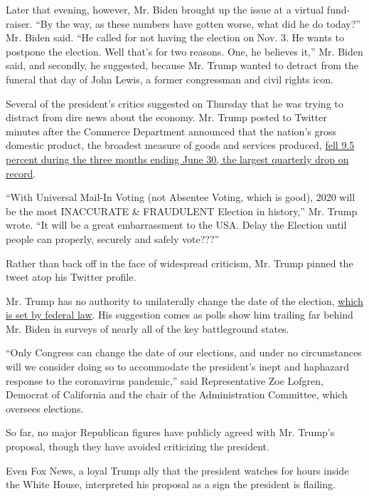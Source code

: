 Later that evening, however, Mr. Biden brought up the issue at a virtual
fund-raiser. ``By the way, as these numbers have gotten worse, what did
he do today?'' Mr. Biden said. ``He called for not having the election
on Nov. 3. He wants to postpone the election. Well that's for two
reasons. One, he believes it,'' Mr. Biden said, and secondly, he
suggested, because Mr. Trump wanted to detract from the funeral that day
of John Lewis, a former congressman and civil rights icon.

Several of the president's critics suggested on Thursday that he was
trying to distract from dire news about the economy. Mr. Trump posted to
Twitter minutes after the Commerce Department announced that the
nation's gross domestic product, the broadest measure of goods and
services produced,
\href{https://www.nytimes3xbfgragh.onion/live/2020/07/30/business/stock-market-today-coronavirus?action=click\&module=Top\%20Stories\&pgtype=Homepage}{fell
9.5 percent during the three months ending June 30, the largest
quarterly drop on record}.

``With Universal Mail-In Voting (not Absentee Voting, which is good),
2020 will be the most INACCURATE \& FRAUDULENT Election in history,''
Mr. Trump wrote. ``It will be a great embarrassment to the USA. Delay
the Election until people can properly, securely and safely vote???''

Rather than back off in the face of widespread criticism, Mr. Trump
pinned the tweet atop his Twitter profile.

Mr. Trump has no authority to unilaterally change the date of the
election,
\href{https://www.nytimes3xbfgragh.onion/2020/03/14/us/politics/election-postponed-canceled.html}{which
is set by federal law}. His suggestion comes as polls show him trailing
far behind Mr. Biden in surveys of nearly all of the key battleground
states.

``Only Congress can change the date of our elections, and under no
circumstances will we consider doing so to accommodate the president's
inept and haphazard response to the coronavirus pandemic,'' said
Representative Zoe Lofgren, Democrat of California and the chair of the
Administration Committee, which oversees elections.

So far, no major Republican figures have publicly agreed with Mr.
Trump's proposal, though they have avoided criticizing the president.

Even Fox News, a loyal Trump ally that the president watches for hours
inside the White House, interpreted his proposal as a sign the president
is flailing.

